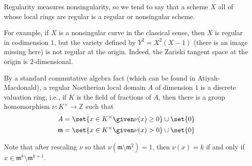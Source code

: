 Regularity measures nonsingularity, so we tend to say that a scheme $X$ all of
whose local rings are regular is a regular or nonsingular scheme.

For example, if $X$ is a nonsingular curve in the classical sense, then $X$ is
regular in codimension $1$, but the variety defined by $Y^2 = X^2(X-1)$ (there is an
image missing here) is not regular at the origin. Indeed, the Zariski tangent space at
the origin is $2$-dimensional.

By a standard commutative algebra fact (which can be found in Atiyah-Macdonald),
a regular Noetherian local domain $A$ of dimension $1$ is a discrete valuation
ring, i.e., if $K$ is the field of fractions of $A$, then there is a group
homomorphism $\nu\colon K^\times \to \mathbb{Z}$ such that
\begin{align*}
	A &= \set{x \in K^\times\given \nu(x)\geq 0} \cup \set{0}\\
	\mathfrak{m} &= \set{x \in K^\times \given \nu(x) > 0} \cup\set{0}
\end{align*}

Note that after rescaling $\nu$ so that $\nu(\mathfrak{m}\setminus \mathfrak{m}^2) = 1$,
then $\nu(x) = k$ if and only if $x \in \mathfrak{m}^k\setminus \mathfrak{m}^{k+1}$.
